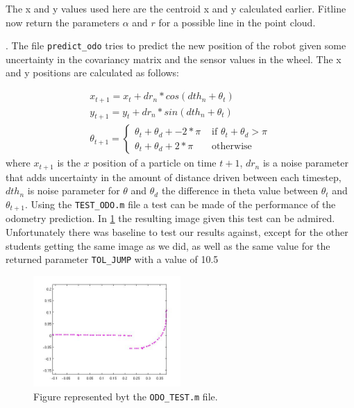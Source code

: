 \documentclass[a4paper, 12pt]{article}
\begin{document}
The x and y values used here are the centroid x and y calculated earlier.
Fitline now return the parameters $\alpha$ and $r$ for a possible line in the
point cloud.

. The file \texttt{predict\_odo} tries to predict the new position of the robot
given some uncertainty in the covariancy matrix and the sensor values in the
wheel.
The x and y positions are calculated as follows:

\begin{align*}
    x_{t+1} = x_{t} + dr_n * cos(dth_n + \theta_t)\\
    y_{t+1} = y_{t} + dr_n * sin(dth_n + \theta_t)\\
\theta_{t+1} = \left\{ \begin{array}{rl}
 \theta_t + \theta_d + -2*\pi &\mbox{ if $\theta_t + \theta_d > \pi$} \\
 \theta_t + \theta_d + 2*\pi&\mbox{ otherwise}
\end{array} \right.
\end{align*}
where $x_{t+1}$ is the $x$ position of a particle on time $t+1$, $dr_n$ is a noise
parameter that adds uncertainty in the amount of distance driven between each
timestep, $dth_n$ is noise parameter for $\theta$ and $\theta_d$ the
difference in theta value between $\theta_t$  and $\theta_{t+1}$.
Using the \texttt{TEST\_ODO.m} file a test can be made of the performance of the
odometry prediction. In \ref{fig:odo_test} the resulting image given this test
can be admired. Unfortunately there was baseline to test our results against,
except for the other students getting the same image as we did, as well as the
same value for the returned parameter \texttt{TOL\_JUMP} with a value of 10.5

\begin{figure}[!ht]
\centering
  \includegraphics[width=0.5\textwidth]{Odo_test.jpg}
  \caption{Figure represented byt the \texttt{ODO\_TEST.m} file. } 
  \label{fig:odo_test}
\end{figure}
\end{document}
